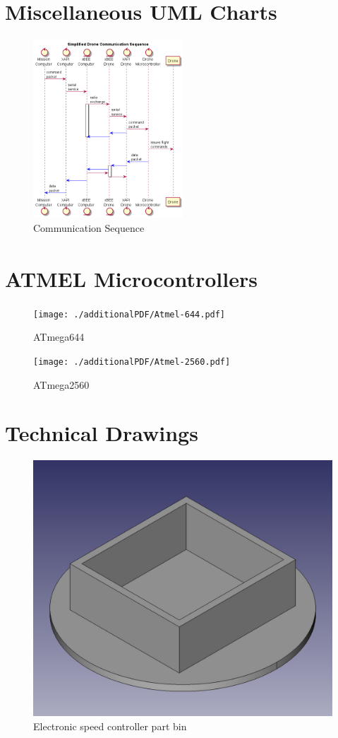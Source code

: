 \documentclass[pdftex,11pt]{article}
\begin{document}
\section{Miscellaneous UML Charts}
\label{sec:appUML}
\begin{figure}[!h]
	\centering
		\includegraphics[width=0.5\textwidth]{./plantUML/droneControlSequence.png}
	\caption{Communication Sequence}
	\label{fig:comseq}
\end{figure}

\clearpage
\section{ATMEL\textsuperscript{\textcopyright} Microcontrollers}
\label{sec:appATMEL}
\begin{figure}[!h]
	\centering
		\texttt{[image: ./additionalPDF/Atmel-644.pdf]}
	\caption{ATmega644}
	\label{fig:ATmega644}
\end{figure}

\begin{figure}[!h]
	\centering
		\texttt{[image: ./additionalPDF/Atmel-2560.pdf]}
	\caption{ATmega2560}
	\label{fig:ATmega2560}
\end{figure}

\clearpage

\section{Technical Drawings}
\label{sec:TechDraw}

\begin{figure}[!h]
	\centering
		\includegraphics[width=.5\textwidth]{./graphics/partbin.jpg}
	\caption{Electronic speed controller part bin}
	\label{fig:partbin}
\end{figure}
\end{document}
